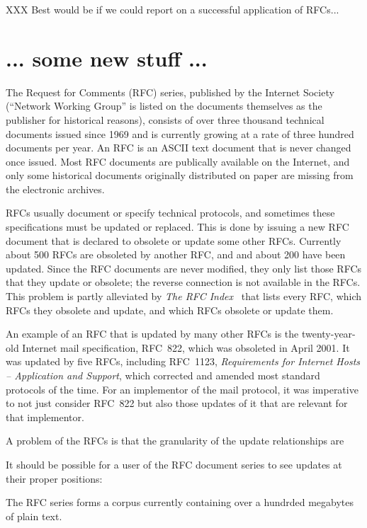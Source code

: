 XXX Best would be if we could report on a successful application of RFCs...

\section{... some new stuff ...}

The Request for Comments (RFC)\cite{rfc-intro} series, published by
the Internet Society (``Network Working Group'' is listed on the
documents themselves as the publisher for historical reasons),
consists of over three thousand technical documents issued since 1969
and is currently growing at a rate of three hundred documents per
year.  An RFC is an ASCII text document that is never changed once
issued.  Most RFC documents are publically available on the Internet,
and only some historical documents originally distributed on paper are
missing from the electronic archives.

RFCs usually document or specify technical protocols, and sometimes
these specifications must be updated or replaced.  This is done by
issuing a new RFC document that is declared to obsolete or update some
other RFCs.  Currently about 500 RFCs are obsoleted by another RFC,
and and about 200 have been updated.  Since the RFC documents are
never modified, they only list those RFCs that they update or
obsolete; the reverse connection is not available in the RFCs.  This
problem is partly alleviated by \emph{The RFC Index}~\cite{rfc-index}
that lists every RFC, which RFCs they obsolete and update, and which
RFCs obsolete or update them.

An example of an RFC that is updated by many other RFCs is the
twenty-year-old Internet mail specification, RFC~822, which was
obsoleted in April 2001.  It was updated by five RFCs, including
RFC~1123, \emph{Requirements for Internet Hosts -- Application and
  Support}, which corrected and amended most standard protocols of the
time.  For an implementor of the mail protocol, it was imperative to
not just consider RFC~822 but also those updates of it that are
relevant for that implementor.

A problem of the RFCs is that the granularity of the update
relationships are 

It should be possible for a user of the RFC document series to see
updates at their proper positions:

The RFC series forms a corpus currently containing over a hundrded
megabytes of plain text.  


%
%
%
